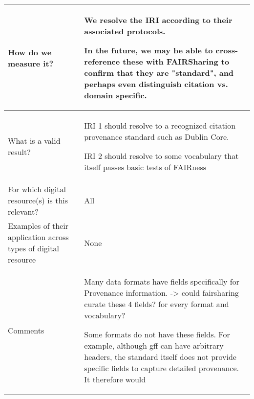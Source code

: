 \documentclass[english]{article}
\begin{document}
\begin{longtable}{|p{5cm}|p{9cm}|}
\\



\hline
How do we measure it? &  


We resolve the IRI according to their associated protocols.  

In the future, we may be able to cross-reference these with FAIRSharing to confirm that they are "standard", and perhaps even distinguish citation vs. domain specific.


\\



\hline
What is a valid result? &  


IRI 1 should resolve to a recognized citation provenance standard such as Dublin Core.\newline 

IRI 2 should resolve to some vocabulary that itself passes basic tests of FAIRness\newline


\\



\hline
For which digital resource(s) is this relevant? &  All\\



\hline
Examples of their application across types of digital resource &  None

\\



\hline

Comments & 


Many data formats have fields specifically for Provenance information.  -> could fairsharing curate these 4 fields? for every format and vocabulary? \newline

Some formats do not have these fields.  For example, although gff can have arbitrary headers, the standard itself does not provide specific fields to capture detailed provenance. It therefore would 




\\
\hline

\end{longtable}





\newpage
\end{document}
